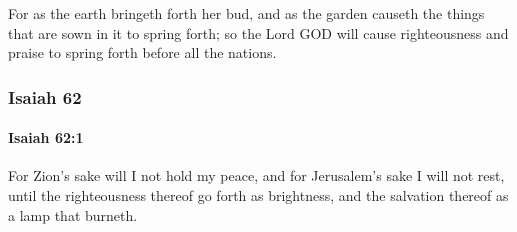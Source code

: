 			For as the earth bringeth forth her bud, and as the garden causeth the things that are sown in it to spring forth; so the Lord GOD will cause righteousness and praise to spring forth before all the nations.

	\subsubsection{Isaiah 62} %
		\label{ISAIAH-62}

		\paragraph{Isaiah 62:1} %
			\label{ISAIAH-62-1}

			For Zion's sake will I not hold my peace, and for Jerusalem's sake I will not rest, until the righteousness thereof go forth as brightness, and the salvation thereof as a lamp that burneth.


